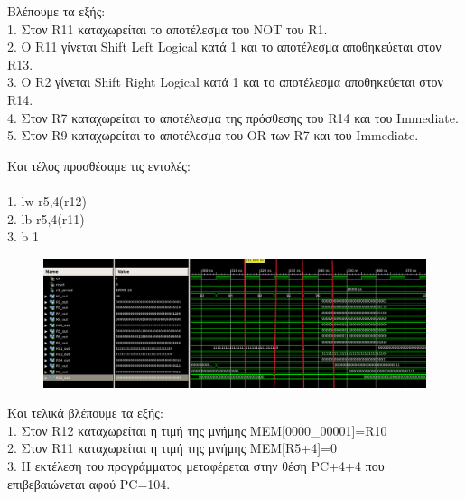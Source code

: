 \newpage

\begin{justify}
    Βλέπουμε τα εξής:\\
    1. Στον \textlatin{R11} καταχωρείται το αποτέλεσμα
    του \textlatin{NOT} του \textlatin{R1}.\\
    2. Ο \textlatin{R11} γίνεται \textlatin{Shift Left Logical} 
    κατά 1 και το αποτέλεσμα αποθηκεύεται στον \textlatin{R13}.\\
    3. Ο \textlatin{R2} γίνεται \textlatin{Shift Right Logical}
    κατά 1 και το αποτέλεσμα αποθηκεύεται στον \textlatin{R14}.\\
    4. Στον \textlatin{R7} καταχωρείται το αποτέλεσμα
    της πρόσθεσης του \textlatin{R14} και του \textlatin{Immediate}.\\
    5. Στον \textlatin{R9} καταχωρείται το αποτέλεσμα
    του \textlatin{OR} των \textlatin{R7} και του \textlatin{Immediate}.
\end{justify}


\begin{justify}
    Και τέλος προσθέσαμε τις εντολές:\\\\  
    \textlatin{1. lw r5,4(r12)}\\
    \textlatin{2. lb r5,4(r11)}\\
    \textlatin{3. b 1}       
\end{justify}

\begin{figure}[h]
    \raggedright
    \hspace{-1cm}
    \includegraphics[width=1.1\textwidth]{Images/Screenshot_6.png} %
\end{figure}

\begin{justify}
    Και τελικά βλέπουμε τα εξής:\\
    1. Στον \textlatin{R12} καταχωρείται η τιμή της μνήμης
    \textlatin{MEM[0000\_00001]=R10}\\
    2. Στον \textlatin{R11} καταχωρείται η τιμή της μνήμης
    \textlatin{MEM[R5+4]=0}\\
    3. Η εκτέλεση του προγράμματος μεταφέρεται στην θέση
    \textlatin{PC+4+4} που επιβεβαιώνεται αφού
    \textlatin{PC=104}.
\end{justify}
